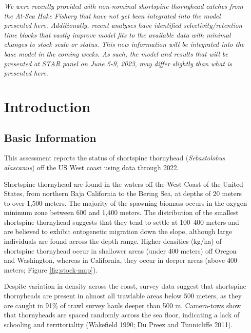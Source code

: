 \documentclass[11pt,
  english,
  letterpaper,
]{article}
\begin{document}
\emph{We were recently provided with non-nominal shortspine thornyhead catches from the At-Sea Hake Fishery that have not yet been integrated into the model presented here. Additionally, recent analyses have identified selectivity/retention time blocks that vastly improve model fits to the available data with minimal changes to stock scale or status. This new information will be integrated into the base model in the coming weeks. As such, the model and results that will be presented at STAR panel on June 5-9, 2023, may differ slightly than what is presented here.}

\pagebreak
\setlength{\parskip}{5mm plus1mm minus1mm}
\setcounter{page}{1}
\renewcommand{\thefigure}{\arabic{figure}}
\renewcommand{\thetable}{\arabic{table}}
\setcounter{table}{0}
\setcounter{figure}{0}

\hypertarget{introduction}{%
\section{Introduction}\label{introduction}}

\hypertarget{basic-information}{%
\subsection{Basic Information}\label{basic-information}}

This assessment reports the status of shortspine thornyhead (\emph{Sebastolobus alascanus}) off the US West coast using data through 2022.

Shortspine thornyhead are found in the waters off the West Coast of the United States, from northern Baja California to the Bering Sea, at depths of 20 meters to over 1,500 meters. The majority of the spawning biomass occurs in the oxygen minimum zone between 600 and 1,400 meters. The distribution of the smallest shortspine thornyhead suggests that they tend to settle at 100--400 meters and are believed to exhibit ontogenetic migration down the slope, although large individuals are found across the depth range. Higher densities (kg/ha) of shortspine thornyhead occur in shallower areas (under 400 meters) off Oregon and Washington, whereas in California, they occur in deeper areas (above 400 meters; Figure \ref{fig:stock-map}).

Despite variation in density across the coast, survey data suggest that shortspine thornyheads are present in almost all trawlable areas below 500 meters, as they are caught in 91\% of trawl survey hauls deeper than 500 m. Camera-tows show that thornyheads are spaced randomly across the sea floor, indicating a lack of schooling and territoriality (Wakefield 1990; Du Preez and Tunnicliffe 2011).
\end{document}
